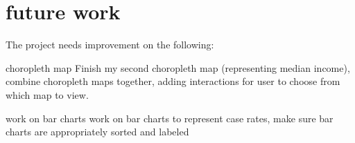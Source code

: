 \documentclass{vgtc}                 %
\begin{document}
\section{future work}{
The project needs improvement on the following:
\item[choropleth map]{Finish my second choropleth map (representing median income), combine choropleth maps together, adding interactions for user to choose from which map to view.}
\item[work on bar charts]{work on bar charts to represent case rates, make sure bar charts are appropriately sorted and labeled}
}

%

%
%
%


\end{document}
